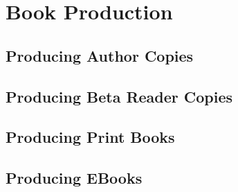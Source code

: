 %
%
%
%
%
%
%
%
%
%

\chapter{Book Production} \label{chap:production}

\section{Producing Author Copies} \label{sec:authorcopy}

\section{Producing Beta Reader Copies} \label{sec:betareader}

\section{Producing Print Books} \label{sec:printbook}

\section{Producing EBooks} \label{sec:ebook}

